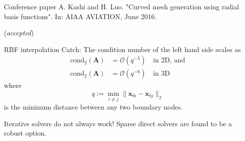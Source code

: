 \documentclass[t,12pt]{beamer}
\let\bld\boldsymbol
\begin{document}
\begin{frame}{Conference paper}
	A. Kashi and H. Luo. "Curved mesh generation using radial basis functions". In: AIAA AVIATION, June 2016. 
	
	(\emph{accepted})
\end{frame}

\printbibliography

\begin{frame}{RBF interpolation}
	Catch: The condition number of the left hand side scales as
	\begin{equation}
	\begin{aligned}
	\text{cond}_2 (\bld{A}) &= \mathcal{O}(q^{-5}) \quad \text{in 2D, and} \\
	\text{cond}_2 (\bld{A}) &= \mathcal{O}(q^{-6}) \quad \text{in 3D}
	\end{aligned}
	\end{equation}
	where
	\begin{equation}
	q := \min_{i\neq j} \lVert \bld{x}_{bi} - \bld{x}_{bj} \rVert_2
	\end{equation}
	is the minimum distance between any two boundary nodes.
	
	Iterative solvers do not always work! Sparse direct solvers are found to be a robust option.
\end{frame}
\end{document}
